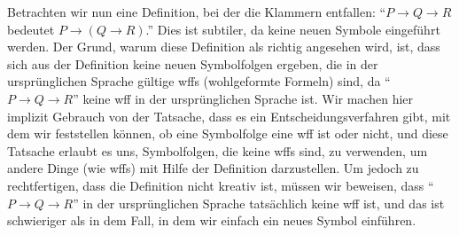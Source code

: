 Betrachten wir nun eine Definition, bei der die Klammern entfallen:  "`$P \rightarrow Q \rightarrow R$ bedeutet $P\rightarrow (Q \rightarrow R)$."' Dies ist subtiler, da keine neuen Symbole eingeführt werden.  Der Grund, warum diese Definition als richtig angesehen wird, ist, dass sich aus der Definition keine neuen Symbolfolgen ergeben, die in der ursprünglichen Sprache gültige wffs (wohlgeformte Formeln) sind, da "`$P \rightarrow Q\rightarrow R$"' keine wff in der ursprünglichen Sprache ist.  Wir machen hier implizit Gebrauch von der Tatsache, dass es ein Entscheidungsverfahren gibt, mit dem wir feststellen können, ob eine Symbolfolge eine wff ist oder nicht, und diese Tatsache erlaubt es uns, Symbolfolgen, die keine wffs sind, zu verwenden, um andere Dinge (wie wffs) mit Hilfe der Definition darzustellen.  Um jedoch zu rechtfertigen, dass die Definition nicht kreativ ist, müssen wir beweisen, dass "`$P \rightarrow Q\rightarrow R$"' in der ursprünglichen Sprache tatsächlich keine wff ist, und das ist schwieriger als in dem Fall, in dem wir einfach ein neues Symbol einführen.

